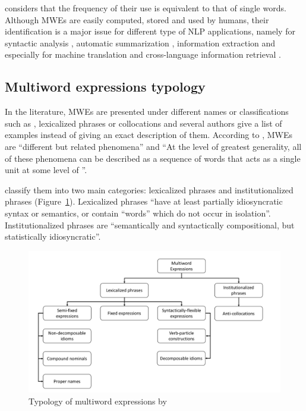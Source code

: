 \documentclass[output=paper,modfonts,nonflat]{langsci/langscibook}
\begin{document}
\cite{jackendoff1997architecture} considers that the frequency of their use is equivalent to that of single words.
Although MWEs are easily computed, stored and used by humans, their identification is a major issue for different type of NLP applications, namely for syntactic analysis \citep{nivre2004multiword,constant2011integrer}, automatic summarization \citep{hogan2007exploiting}, information extraction \citep{vechtomova2005role} and especially for machine translation and cross-language information retrieval \citep{carpuat2010task,ren2009improving}.

\subsection{Multiword expressions typology}

In the literature, MWEs are presented under different names or classifications such as , lexicalized phrases or collocations and several authors \citep{ramisch2013introduction} give a list of examples instead of giving an exact description of them.
According to \cite{calzolari2002}, MWEs are ``different but related phenomena'' and ``At the level of greatest generality, all of these phenomena can be described as a sequence of words that acts as a single unit at some level of ''.

\cite{sag02} classify them into two main categories: lexicalized phrases and institutionalized phrases (Figure~\ref{sem:fig:TypoMWE}).
Lexicalized phrases ``have at least partially idiosyncratic syntax or semantics, or contain ``words'' which do not occur in isolation''.
Institutionalized phrases are ``semantically and syntactically compositional, but statistically idiosyncratic''.

\begin{figure}
\includegraphics[width=\linewidth]{figures/figureTypologyMWE_NB.pdf}
\caption{\label{sem:fig:TypoMWE}Typology of multiword expressions by \cite{sag02}}
\end{figure}
\end{document}
